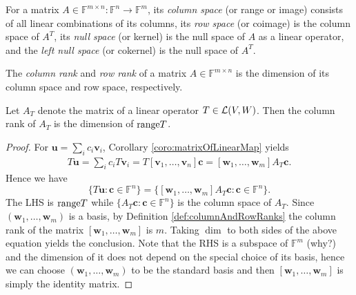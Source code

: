 \begin{defn}
  \label{def:columnAndRowSpaces}
  For a matrix $A\in \mathbb{F}^{m\times n}:
  \mathbb{F}^n\rightarrow \mathbb{F}^m$,
  its \emph{column space} (or range or image)
  consists of all linear combinations of its columns,
  its \emph{row space} (or coimage) is the column space of $A^T$,
  its \emph{null space} (or kernel) is the null space of $A$
  as a linear operator, 
  and the \emph{left null space} (or cokernel)
  is the null space of $A^T$.
\end{defn}

\begin{defn}
  \label{def:columnAndRowRanks}
  The \emph{column rank} and \emph{row rank}
   of a matrix $A\in \mathbb{F}^{m\times n}$
   is the dimension of its column space
   and row space, respectively.
\end{defn}

\begin{lem}
  \label{lem:dimRangeTisColumnRankOfTmat}
  Let $A_T$ denote the matrix of a linear operator $T\in {\cal L}(V,W)$.
  Then the column rank of $A_T$ is the dimension of $\mathrm{range} T$.
\end{lem}
\begin{proof}
  For $\mathbf{u}=\sum_i c_i\mathbf{v}_i$,
   Corollary \ref{coro:matrixOfLinearMap} yields
   \begin{align*}
     T\mathbf{u} = \sum_i c_iT\mathbf{v}_i = T [\mathbf{v}_1, \ldots, \mathbf{v}_n] \mathbf{c}
     = [\mathbf{w}_1, \ldots, \mathbf{w}_m] A_T \mathbf{c}.
   \end{align*}
  Hence we have
  \begin{displaymath}
    \{T\mathbf{u}: \mathbf{c}\in \mathbb{F}^n\}
    = \{[\mathbf{w}_1, \ldots, \mathbf{w}_m] A_T \mathbf{c}:
    \mathbf{c}\in \mathbb{F}^n\}.
  \end{displaymath}
  The LHS is $\mathrm{range} T$ while
   $\{A_T \mathbf{c}: \mathbf{c}\in \mathbb{F}^n\}$
   is the column space of $A_T$.
  Since $(\mathbf{w}_1, \ldots, \mathbf{w}_m)$
   is a basis,
   by Definition \ref{def:columnAndRowRanks}
   the column rank of the matrix 
   $[\mathbf{w}_1, \ldots, \mathbf{w}_m]$ is $m$.
  Taking $\dim$ to both sides of the above equation
   yields the conclusion.
  Note that the RHS is a subspace of $\mathbb{F}^m$ (why?)
   and the dimension of it
   does not depend on the special choice of its basis,
   hence we can choose $(\mathbf{w}_1, \ldots, \mathbf{w}_m)$
   to be the standard basis
   and then $[\mathbf{w}_1, \ldots, \mathbf{w}_m]$ is
   simply the identity matrix.
\end{proof}

